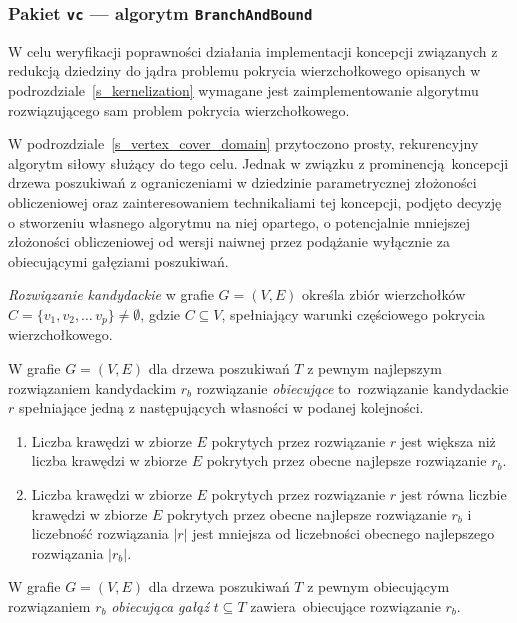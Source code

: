 \subsubsection{\textbf{Pakiet \texttt{vc} --- algorytm \texttt{BranchAndBound}}}
\label{ss_internals_bnb}
\par{
  W celu weryfikacji poprawności działania implementacji koncepcji związanych z redukcją dziedziny do jądra problemu pokrycia wierzchołkowego opisanych w podrozdziale~\ref{s_kernelization} wymagane jest zaimplementowanie algorytmu rozwiązującego sam problem pokrycia wierzchołkowego.

  W podrozdziale~\ref{s_vertex_cover_domain} przytoczono prosty, rekurencyjny algorytm siłowy służący do tego celu.
  Jednak w związku z prominencją koncepcji drzewa poszukiwań z ograniczeniami w dziedzinie parametrycznej złożoności obliczeniowej oraz zainteresowaniem technikaliami tej koncepcji, podjęto decyzję o stworzeniu własnego algorytmu na niej opartego, o potencjalnie mniejszej złożoności obliczeniowej od wersji naiwnej przez podążanie wyłącznie za obiecującymi gałęziami poszukiwań.

  \begin{definition}
    \emph{Rozwiązanie kandydackie} w grafie $G=(V, E)$ określa zbiór wierzchołków $C=\{v_1, v_2, \ldots\, v_p\} \neq \emptyset$, gdzie $C \subseteq V$, spełniający warunki częściowego pokrycia wierzchołkowego.
  \end{definition}
  \begin{definition}
    W grafie $G=(V,E)$ dla drzewa poszukiwań $T$ z pewnym najlepszym rozwiązaniem kandydackim $r_b$ rozwiązanie \emph{obiecujące} to rozwiązanie kandydackie $r$ spełniające jedną z następujących własności w podanej kolejności.
    \begin{enumerate}
      \item Liczba krawędzi w zbiorze $E$ pokrytych przez rozwiązanie $r$ jest większa niż liczba krawędzi w zbiorze $E$ pokrytych przez obecne najlepsze rozwiązanie $r_b$.
      \item Liczba krawędzi w zbiorze $E$ pokrytych przez rozwiązanie $r$ jest równa liczbie krawędzi w zbiorze $E$ pokrytych przez obecne najlepsze rozwiązanie $r_b$ i liczebność rozwiązania $|r|$ jest mniejsza od liczebności obecnego najlepszego rozwiązania $|r_b|$.
    \end{enumerate}
  \end{definition}
  \begin{definition}
     W grafie $G=(V, E)$ dla drzewa poszukiwań $T$ z pewnym obiecującym rozwiązaniem $r_b$ \emph{obiecująca gałąź} $t \subseteq T$ zawiera obiecujące rozwiązanie $r_b$.
  \end{definition}
}
